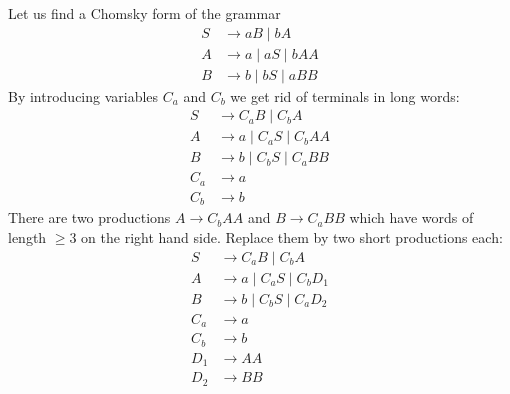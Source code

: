 \begin{exl}
Let us find a Chomsky form of the grammar
\begin{align*}
S &\to aB \mid bA\\
A &\to a \mid aS \mid bAA\\
B &\to b \mid bS \mid aBB
\end{align*}
By introducing variables $C_a$ and $C_b$ we get rid of terminals in long words:
\begin{align*}
S &\to C_aB \mid C_bA\\
A &\to a \mid C_aS \mid C_bAA\\
B &\to b \mid C_bS \mid C_aBB\\
C_a &\to a\\
C_b &\to b
\end{align*}
There are two productions $A \to C_bAA$ and $B \to C_aBB$ which have words of length $\ge 3$ on the right hand side.
Replace them by two short productions each:
\begin{align*}
S &\to C_aB \mid C_bA\\
A &\to a \mid C_aS \mid C_bD_1\\
B &\to b \mid C_bS \mid C_aD_2\\
C_a &\to a\\
C_b &\to b\\
D_1 &\to AA\\
D_2 &\to BB
\end{align*}
\end{exl}